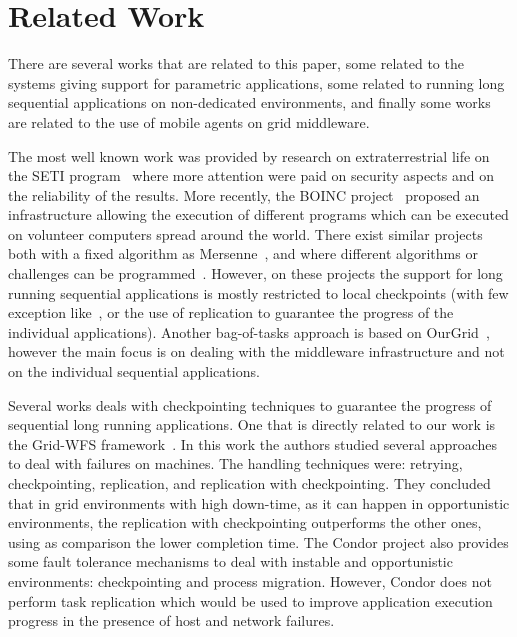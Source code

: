 \documentclass{sig-alternate}
\begin{document}

\section{Related Work}

There are several works that are related to this paper, some related to the
systems giving support for parametric applications, some related to
running long sequential applications on non-dedicated environments, and finally
some works are related to the use of mobile agents on grid middleware.

The most well known work was provided by research on extraterrestrial life on
the SETI program~\cite{seti} where more attention were paid on security aspects
and on the reliability of the results. More recently, the BOINC
project~\cite{boinc} proposed an infrastructure allowing the execution of
different programs which can be executed on volunteer computers spread around
the world. There exist similar projects both with a fixed algorithm as
Mersenne~\cite{mersenne}, and where different algorithms or challenges can be
programmed~\cite{distributed}. However, on these projects the support for long
running sequential applications is mostly restricted to local checkpoints (with
few exception like~\cite{climate}, or the use of replication to guarantee the
progress of the individual applications). Another bag-of-tasks approach is
based on OurGrid~\cite{cirne06}, however the main focus is on dealing with
the middleware infrastructure and not on the individual sequential
applications.

Several works deals with checkpointing techniques to guarantee the progress of
sequential long running applications. One that is directly related to our
work is the Grid-WFS framework~\cite{hwang03}. In this work the authors studied several approaches to
deal with failures on machines. The handling techniques were: retrying, checkpointing,
replication, and replication with checkpointing. They concluded that in grid
environments with high down-time, as it can happen in opportunistic environments,
the replication with checkpointing outperforms the other ones, using as comparison
the lower completion time. The Condor project also provides some fault tolerance mechanisms
to deal with instable and opportunistic environments: checkpointing and process
migration. However, Condor does not perform task replication which would be
used to improve application execution progress in the presence of host and
network failures.
\end{document}
